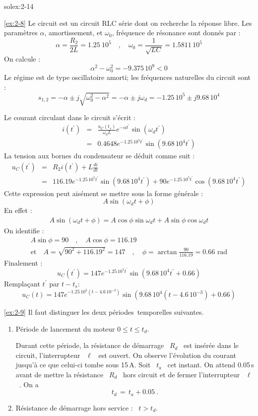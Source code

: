 \begin{exwithsol}{solex:2-14}
\begin{solexercise}{\ref{ex:2-8}}
Le circuit est un circuit RLC s\'erie dont on recherche la r\'eponse
libre. Les param\`etres $\alpha$, amortissement, et $\omega_0$, fr\'equence de
r\'esonance sont donn\'es par :
\[\alpha=\frac{R_2}{2L}=1.25\ 10^5\quad , \quad
\omega_0=\frac{1}{\sqrt{LC}}=1.5811\, 10^5\]
On calcule :
\[\alpha^2-\omega_0^2=-9.375\, 10^9 <0\]
Le r\'egime est de type oscillatoire amorti; les fr\'equences naturelles
du circuit sont :
\[s_{1,2}=-\alpha \pm j\sqrt{\omega_0^2-\alpha^2}=-\alpha \pm j\omega_d=
-1.25\, 10^5 \pm
j9.68\, 10^4\]

Le courant circulant dans le circuit s'\'ecrit :
\begin{eqnarray*}
	i(t^{'})&=&\frac{u_C(t_s)}{\omega_d L}e^{-\alpha t^{'}}\sin (\omega_d
	t^{'})\\
	& = & 0.4648 e^{-1.25\, 10^5 t^{'}}\sin (9.68\, 10^4 t^{'})
\end{eqnarray*}
La tension aux bornes du condensateur se d\'eduit comme suit :
\begin{eqnarray*}
	u_C(t^{'})& = &R_2 i(t^{'})+L\frac{di}{dt}\\
	& = & 116.19 e^{-1.25\, 10^5 t^{'}}\sin (9.68\, 10^4 t^{'}) + 90 e^{-1.25\, 10^5 t^{'}}\cos (9.68\, 10^4 t^{'})
\end{eqnarray*}
Cette expression peut ais\'ement se mettre sous la forme g\'en\'erale :
\[ A\sin (\omega_d t + \phi)\]
En effet :
\begin{align*}
A\sin (\omega_d t + \phi)=A \cos \phi \sin \omega_d t + A\sin \phi \cos
\omega_d t
\end{align*}
On identifie :
\begin{align*}
A\sin \phi = 90 \quad , \quad A \cos \phi =  116.19\\
\mbox{et} \quad A = \sqrt{90^2+116.19^2}=147 \quad , \quad \phi =
\arctan \frac{90}{116.19}=0.66 \, \, \text{rad}
\end{align*}
Finalement :
\[u_C(t^{'})=147 e^{-1.25\, 10^5 t^{'}}\sin (9.68\, 10^4 t^{'}+0.66)\]
Rempla\c{c}ant $t^{'}$ par $t-t_s$:
\[u_C(t)=147 e^{-1.25\, 10^5 (t-4.6\, 10^{-3})}\sin (9.68\, 10^4(t-4.6\, 10^{-3})+0.66)\]
\end{solexercise}

\begin{solexercise}{\ref{ex:2-9}}
	\label{solex:2-9}
Il faut distinguer les deux p\'eriodes~temporelles suivantes. 
\begin{enumerate}
	\item P\'eriode de lancement du moteur \: $0\leq t \leq t_d$.
	
	Durant cette p\'eriode, la r\'esistance de d\'emarrage \ $R_d$ \ est
	ins\'er\'ee dans le circuit, l'interrupteur \ $\ell$ \ est ouvert.  On
	observe l'\'evolution du courant jusqu'\`a ce que celui-ci tombe sous
	15$\,$A. Soit \ $t_a$ \ cet instant. On attend 0.05$\,$s avant de
	mettre la r\'esistance \ $R_d$ \ hors circuit et de fermer
	l'interrupteur \ $\ell$~. On a
	\[ t_d \, = \, t_a + 0.05~. \]           
	\item R\'esistance de d\'emarrage hors service : \ $t>t_d$.
\end{enumerate}
\vspace*{1ex}


\end{solexercise}
\end{exwithsol}
